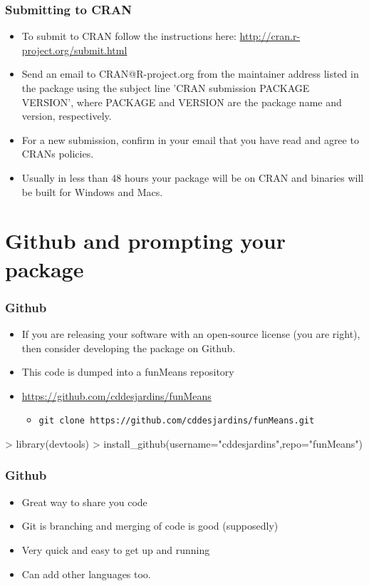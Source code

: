 \documentclass[xcolor=svgnames]{beamer}
\begin{document}
\begin{frame}
  \frametitle{Submitting to CRAN}
  \begin{itemize}
  \item To submit to CRAN follow the instructions here: \url{http://cran.r-project.org/submit.html}
  \item Send an email to CRAN@R-project.org from the maintainer address listed in the package using the subject line 'CRAN submission PACKAGE VERSION', where PACKAGE and VERSION are the package name and version, respectively. 
  \item For a new submission, confirm in your email that you have read and agree to CRANs policies.
    \item Usually in less than 48 hours your package will be on CRAN and binaries will be built for Windows and Macs.
  \end{itemize}
\end{frame}

\section{Github and prompting your package}

\begin{frame}[fragile]
  \frametitle{Github}
  \begin{itemize}
  \item If you are releasing your software with an open-source license (you are right), then consider developing the package on Github.
    \item This code is dumped into a funMeans repository
      \item \url{https://github.com/cddesjardins/funMeans}
        \begin{itemize}
        \item \texttt{git clone https://github.com/cddesjardins/funMeans.git}
        \end{itemize}
  \end{itemize}    
 
\begin{Schunk}
\begin{Sinput}
> library(devtools)
> install_github(username="cddesjardins",repo="funMeans")
\end{Sinput}
\end{Schunk}
\end{frame}

\begin{frame}
  \frametitle{Github}
  \begin{itemize}
    \item Great way to share you code
    \item Git is branching and merging of code is good (supposedly)
      \item Very quick and easy to get up and running
      \item Can add other languages too.
    \end{itemize}
\end{frame}
\end{document}
